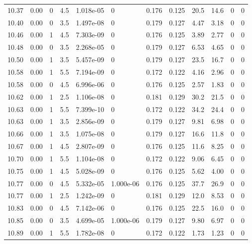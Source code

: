 \documentclass[preview]{standalone}
\begin{document}
{{{{{{{{{{\begin{tabular}{L{1.2cm}C{1.2cm} C{0.3cm}C{0.5cm} C{1.4cm}C{1.4cm} C{1.4cm}C{1.4cm} C{1.6cm}C{1.6cm} C{1.6cm}C{1.6cm}}
  10.37  &  0.00  & 0     & 4.5 &  1.018e-05  & 0  &  0.176&   0.125& 20.5 & 14.6   &  0 & 0  \\ 
  10.40  &  0.00  & 0     & 3.5 &  1.497e-08  & 0  &  0.179&   0.127& 4.47 & 3.18   &  0 & 0  \\ 
  10.46  &  0.00  & 1     & 4.5 &  7.303e-09  & 0  &  0.176&   0.125& 3.89 & 2.77   &  0 & 0  \\ 
  10.48  &  0.00  & 0     & 3.5 &  2.268e-05  & 0  &  0.179&   0.127& 6.53 & 4.65   &  0 & 0  \\ 
  10.50  &  0.00  & 1     & 3.5 &  5.457e-09  & 0  &  0.179&   0.127& 23.5 & 16.7   &  0 & 0  \\ 
  10.58  &  0.00  & 1     & 5.5 &  7.194e-09  & 0  &  0.172&   0.122& 4.16 & 2.96   &  0 & 0  \\ 
  10.58  &  0.00  & 0     & 4.5 &  6.996e-06  & 0  &  0.176&   0.125& 2.57 & 1.83   &  0 & 0  \\ 
  10.62  &  0.00  & 1     & 2.5 &  1.106e-08  & 0  &  0.181&   0.129& 30.2 & 21.5   &  0 & 0  \\ 
  10.63  &  0.00  & 1     & 5.5 &  7.399e-10  & 0  &  0.172&   0.122& 34.2 & 24.4   &  0 & 0  \\ 
  10.63  &  0.00  & 1     & 3.5 &  2.856e-09  & 0  &  0.179&   0.127& 9.81 & 6.98   &  0 & 0  \\ 
  10.66  &  0.00  & 1     & 3.5 &  1.075e-08  & 0  &  0.179&   0.127& 16.6 & 11.8   &  0 & 0  \\ 
  10.67  &  0.00  & 1     & 4.5 &  2.807e-09  & 0  &  0.176&   0.125& 11.6 & 8.25   &  0 & 0  \\ 
  10.70  &  0.00  & 1     & 5.5 &  1.104e-08  & 0  &  0.172&   0.122& 9.06 & 6.45   &  0 & 0  \\ 
  10.75  &  0.00  & 1     & 4.5 &  5.028e-09  & 0  &  0.176&   0.125& 5.62 & 4.00   &  0 & 0  \\ 
  10.77  &  0.00  & 0     & 4.5 &  5.332e-05  & 1.000e-06  &  0.176&   0.125& 37.7 & 26.9   &  0 & 0  \\ 
  10.77  &  0.00  & 1     & 2.5 &  1.242e-09  & 0  &  0.181&   0.129& 12.0 & 8.53   &  0 & 0  \\ 
  10.83  &  0.00  & 0     & 4.5 &  7.142e-06  & 0  &  0.176&   0.125& 22.5 & 16.0   &  0 & 0  \\ 
  10.85  &  0.00  & 0     & 3.5 &  4.699e-05  & 1.000e-06  &  0.179&   0.127& 9.80 & 6.97   &  0 & 0  \\ 
  10.89  &  0.00  & 1     & 5.5 &  1.782e-08  & 0  &  0.172&   0.122& 1.73 & 1.23   &  0 & 0  \\ 

\end{tabular}}}}}}}}}}}
\end{document}

